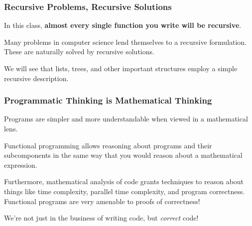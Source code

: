\documentclass[aspectratio=169, handout]{beamer}
\begin{document}
\begin{frame}[fragile]
  \frametitle{Recursive Problems, Recursive Solutions}

  In this class, \textbf{almost every single function you write will be recursive}.

  \pause
  \vspace{\fill}

  Many problems in computer science lend themselves to a recursive formulation. These
  are naturally solved by recursive solutions.

  \pause
  \vspace{\fill}

  We will see that lists, trees, and other important structures employ a simple
  recursive description.

\end{frame}

\begin{frame}[fragile]
  \frametitle{Programmatic Thinking is Mathematical Thinking}

  Programs are simpler and more understandable when viewed in a mathematical lens.

  \pause
  \vspace{\fill}

  Functional programming allows reasoning about programs and their subcomponents
  in the same way that you would reason about a mathematical expression.

  \pause
  \vspace{\fill}

  Furthermore, mathematical analysis of code grants techniques to reason about
  things like time complexity, parallel time complexity, and program correctness.
  Functional programs are very amenable to proofs of correctness!

  \pause
  \vspace{\fill}

  We're not just in the business of writing code, but \textit{correct} code!

\end{frame}
\end{document}
